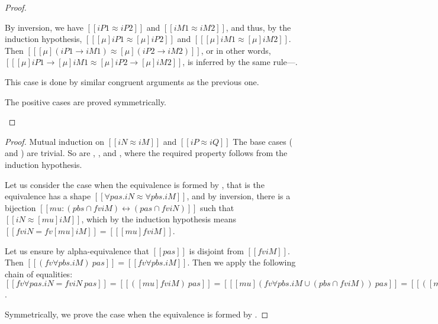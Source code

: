 \begin{proof}
\begin{caseof}
      By inversion, we have $[[iP1 ≈ iP2]]$ and $[[iM1 ≈ iM2]]$,
      and thus, by the induction hypothesis,
      $[[ [μ]iP1 ≈ [μ]iP2 ]]$ and $[[ [μ]iM1 ≈ [μ]iM2 ]]$.
      Then $[[ [μ](iP1 → iM1) ≈ [μ](iP2 → iM2) ]]$, 
      or in other words, $[[ [μ]iP1 → [μ]iM1 ≈ [μ]iP2 → [μ]iM2 ]]$,
      is inferred by the same rule---.
    \item {}
      This case is done by similar congruent arguments as
      the previous one.
    \item The positive cases are proved symmetrically.
    \end{caseof}
\end{proof}

\lemmaEquivFV*
\begin{proof}
  Mutual induction on $[[iN ≈ iM]]$ and $[[iP ≈ iQ]]$
  The base cases 
  ( and )
  are trivial.
  So are , 
  , and
  , where
  the required property follows from the induction hypothesis.

  Let us consider the case when the equivalence is formed by
  , 
  that is the equivalence has a shape 
  $[[∀pas.iN ≈ ∀pbs.iM]]$, 
  and by inversion,
  there is a bijection 
  $[[mu : ({pbs} ∩ fv iM) ↔ ({pas} ∩ fv iN)]]$
  such that $[[iN ≈ [mu] iM]]$, which 
  by the induction hypothesis means
  $[[ fv iN = fv [mu]iM ]] = [[ [mu] fv iM]] $.
  
  Let us ensure by alpha-equivalence that 
  $[[pas]]$ is disjoint from $[[fv iM]]$.
  Then $[[ (fv ∀pbs.iM) \ {pas}]] = [[fv ∀pbs.iM]]$.
  Then we apply the following chain of equalities:
  $[[fv ∀pas.iN = fv iN \ {pas}]] = 
  [[ ([mu] fv iM) \ {pas}]] = 
  [[ [mu] (fv ∀pbs.iM ∪ ({pbs} ∩ fv iM)) \ {pas}]] = 
  [[ ([mu] fv ∀pbs.iM ∪ [mu]({pbs} ∩ fv iM)) \ {pas}]] = 
  [[ ([mu] fv ∀pbs.iM) \ {pas}]] = 
  [[ (fv ∀pbs.iM) \ {pas}]] = 
  [[  fv ∀pbs.iM ]]$.

  Symmetrically, we prove the case when the equivalence is formed by
  .
\end{proof}

